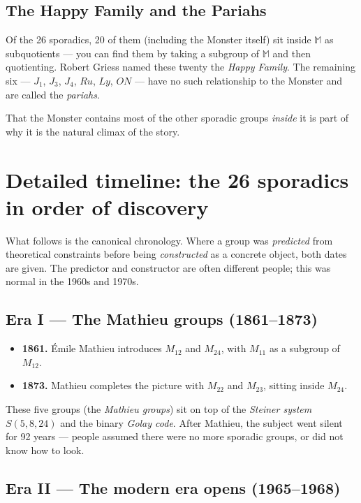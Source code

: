 \documentclass[11pt]{article}
\newcommand{\M}{\mathbb{M}}
\begin{document}
\subsection*{The Happy Family and the Pariahs}

Of the 26 sporadics, 20 of them (including the Monster itself) sit
inside $\M$ as subquotients --- you can find them by taking a
subgroup of $\M$ and then quotienting. Robert Griess named these
twenty the \emph{Happy Family}. The remaining six --- $J_1$, $J_3$,
$J_4$, $\mathit{Ru}$, $\mathit{Ly}$, $\mathit{ON}$ --- have no such
relationship to the Monster and are called the \emph{pariahs}.

That the Monster contains most of the other sporadic groups
\emph{inside} it is part of why it is the natural climax of the
story.

\section*{Detailed timeline: the 26 sporadics in order of discovery}

What follows is the canonical chronology. Where a group was
\emph{predicted} from theoretical constraints before being
\emph{constructed} as a concrete object, both dates are given. The
predictor and constructor are often different people; this was normal
in the 1960s and 1970s.

\subsection*{Era I --- The Mathieu groups (1861--1873)}

\begin{itemize}[leftmargin=*, itemsep=2pt]
  \item \textbf{1861.} \'Emile Mathieu introduces $M_{12}$ and
        $M_{24}$, with $M_{11}$ as a subgroup of $M_{12}$.
  \item \textbf{1873.} Mathieu completes the picture with $M_{22}$
        and $M_{23}$, sitting inside $M_{24}$.
\end{itemize}

These five groups (the \emph{Mathieu groups}) sit on top of the
\emph{Steiner system} $S(5,8,24)$ and the binary \emph{Golay code}.
After Mathieu, the subject went silent for 92 years --- people
assumed there were no more sporadic groups, or did not know how to
look.

\subsection*{Era II --- The modern era opens (1965--1968)}
\end{document}
